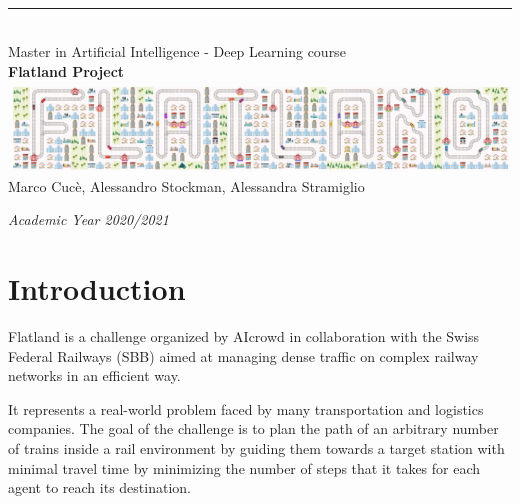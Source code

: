 \documentclass[12pt]{article}
\begin{document}


\begin{titlepage}

\newcommand{\HRule}{\rule{\linewidth}{0.3mm}} 							%
\center 

\vspace*{15mm} 
\\[0.3cm]
\HRule \\[0.4cm]
\textsf{Master in Artificial Intelligence - Deep Learning course}\\[2cm]


{ \huge\textbf{Flatland Project} }\\[1.5cm]							
\includegraphics[scale=0.50]{res/title.png}\\[1cm] 
\textsf{Marco Cucè, Alessandro Stockman, Alessandra Stramiglio}\\
\vspace{8cm}
\vfill

\textit{Academic Year 2020/2021} 


\end{titlepage}


\tableofcontents
\newpage


\section{Introduction}

Flatland \cite{flatland-challenge} is a challenge organized by AIcrowd in collaboration with the Swiss Federal Railways (SBB) aimed at managing dense traffic on complex railway networks in an efficient way.

It represents a real-world problem faced by many transportation and logistics companies. The goal of the challenge is to plan the path of an arbitrary number of trains inside a rail environment by guiding them towards a target station with minimal travel time by minimizing the number of steps that it takes for each agent to reach its destination. 
\end{document}
